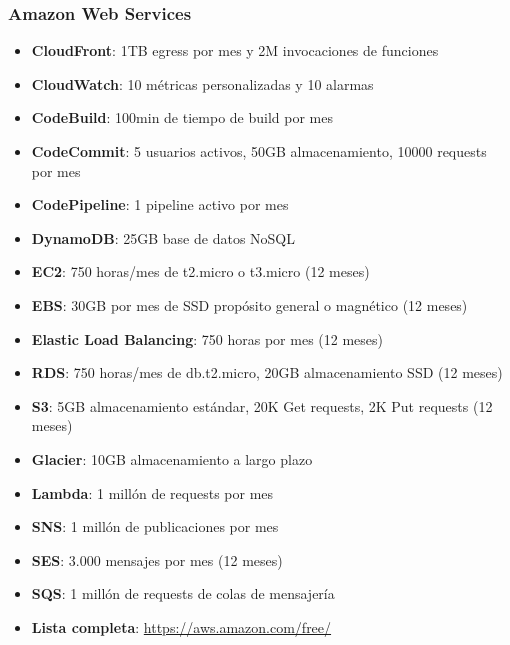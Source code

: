 \subsubsection*{Amazon Web Services}
\begin{itemize}
	\item \textbf{CloudFront}: 1TB egress por mes y 2M invocaciones de funciones
	\item \textbf{CloudWatch}: 10 métricas personalizadas y 10 alarmas
	\item \textbf{CodeBuild}: 100min de tiempo de build por mes
	\item \textbf{CodeCommit}: 5 usuarios activos, 50GB almacenamiento, 10000 requests por mes
	\item \textbf{CodePipeline}: 1 pipeline activo por mes
	\item \textbf{DynamoDB}: 25GB base de datos NoSQL
	\item \textbf{EC2}: 750 horas/mes de t2.micro o t3.micro (12 meses)
	\item \textbf{EBS}: 30GB por mes de SSD propósito general o magnético (12 meses)
	\item \textbf{Elastic Load Balancing}: 750 horas por mes (12 meses)
	\item \textbf{RDS}: 750 horas/mes de db.t2.micro, 20GB almacenamiento SSD (12 meses)
	\item \textbf{S3}: 5GB almacenamiento estándar, 20K Get requests, 2K Put requests (12 meses)
	\item \textbf{Glacier}: 10GB almacenamiento a largo plazo
	\item \textbf{Lambda}: 1 millón de requests por mes
	\item \textbf{SNS}: 1 millón de publicaciones por mes
	\item \textbf{SES}: 3.000 mensajes por mes (12 meses)
	\item \textbf{SQS}: 1 millón de requests de colas de mensajería
	\item \textbf{Lista completa}: \url{https://aws.amazon.com/free/}
\end{itemize}

